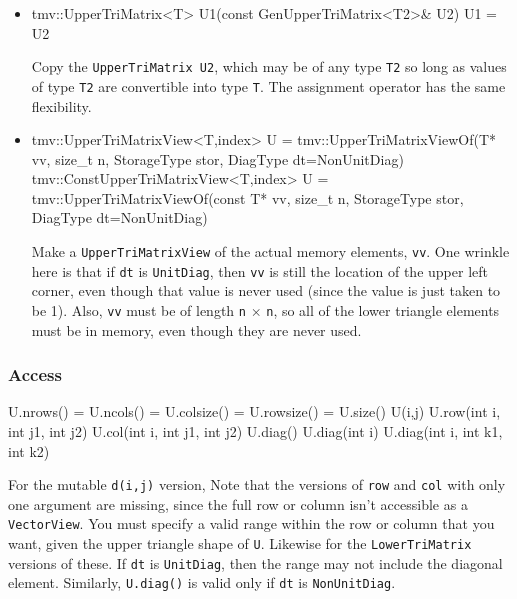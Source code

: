 \documentclass[twoside,letterpaper,11pt]{article}
\renewcommand{\tt}[1]{{\lstinline {#1}}}
\begin{document}
\begin{itemize}
\item
\begin{tmvcode}
tmv::UpperTriMatrix<T> U1(const GenUpperTriMatrix<T2>& U2)
U1 = U2
\end{tmvcode}
Copy the \tt{UpperTriMatrix U2}, which may be of any type \tt{T2} so long
as values of type \tt{T2} are convertible into type \tt{T}.
The assignment operator has the same flexibility.

\item
\begin{tmvcode}
tmv::UpperTriMatrixView<T,index> U = 
      tmv::UpperTriMatrixViewOf(T* vv, size_t n, 
      StorageType stor, DiagType dt=NonUnitDiag)
tmv::ConstUpperTriMatrixView<T,index> U = 
      tmv::UpperTriMatrixViewOf(const T* vv, size_t n, 
      StorageType stor, DiagType dt=NonUnitDiag)
\end{tmvcode}
Make a \tt{UpperTriMatrixView} of the actual memory elements, \tt{vv}.
One wrinkle here is that if \tt{dt} is \tt{UnitDiag}, then 
\tt{vv} is still the location of the
upper left corner, even though that value is never used 
(since the value is just taken to
be 1).  Also, \tt{vv} must be of length \tt{n} $\times$ \tt{n},
so all of the lower triangle
elements must be in memory, even though they are never used.

\end{itemize}

\subsubsection{Access}

\begin{tmvcode}
U.nrows() = U.ncols() = U.colsize() = U.rowsize() = U.size()
U(i,j)
U.row(int i, int j1, int j2)
U.col(int i, int j1, int j2)
U.diag()
U.diag(int i)
U.diag(int i, int k1, int k2)
\end{tmvcode}
For the mutable \tt{d(i,j)} version, 
Note that the versions of \tt{row} and \tt{col} with only one argument are
missing, since the full row or column isn't accessible as a \tt{VectorView}.
You must specify a valid range within the row or column that you want, 
given the upper triangle shape of \tt{U}.  Likewise for the \tt{LowerTriMatrix}
versions of these.
If \tt{dt} is \tt{UnitDiag}, then the range may not include the diagonal element.
Similarly, \tt{U.diag()} is valid only if \tt{dt} is \tt{NonUnitDiag}.
\end{document}

